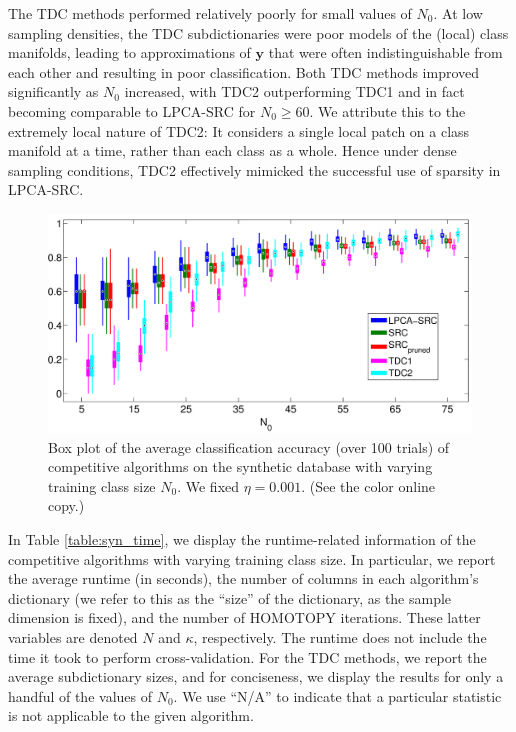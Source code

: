 \documentclass[review]{elsarticle}
\begin{document}
The TDC methods performed relatively poorly for small values of $N_0$. At low sampling densities, the TDC subdictionaries were poor models of the (local) class manifolds, leading to approximations of $\bm{y}$ that were often indistinguishable from each other and resulting in poor classification. Both TDC methods improved significantly as $N_0$ increased, with TDC2 outperforming TDC1 and in fact becoming comparable to LPCA-SRC for $N_0 \geq 60$. We attribute this to the extremely local nature of TDC2: It considers a single local patch on a class manifold at a time, rather than each class as a whole. Hence under dense sampling conditions, TDC2 effectively mimicked the successful use of sparsity in LPCA-SRC.


\begin{figure}[t]
\begin{center}
\includegraphics[width=0.95\linewidth]{Fig_2}
\caption{Box plot of the average classification accuracy (over 100 trials) of competitive algorithms on the synthetic database with varying training class size $N_0$. We fixed $\eta = 0.001$. (See the color online copy.) }
\label{syn_data_set_varying_class_size}
\end{center}
\end{figure}

In Table \ref{table:syn_time}, we display the runtime-related information of the competitive algorithms with varying training class size. In particular, we report the average runtime (in seconds), the number of columns in each algorithm's dictionary (we refer to this as the ``size'' of the dictionary, as the sample dimension is fixed), and the number of HOMOTOPY iterations. These latter variables are denoted $N$ and $\kappa$, respectively. The runtime does not include the time it took to perform cross-validation. For the TDC methods, we report the average subdictionary sizes, and for conciseness, we display the results for only a handful of the values of $N_0$. We use ``N/A'' to indicate that a particular statistic is not applicable to the given algorithm. 
\end{document}
